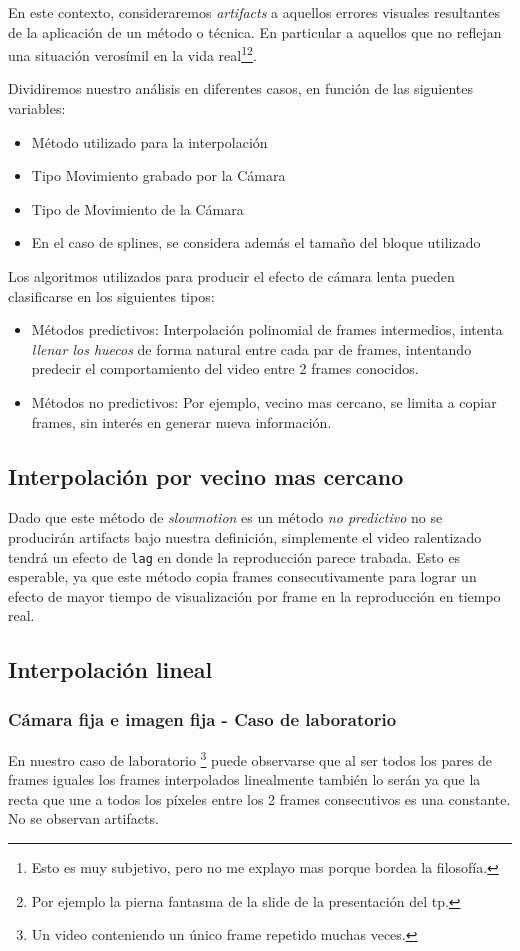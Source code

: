 En este contexto, consideraremos \emph{artifacts} a aquellos errores visuales resultantes de la aplicaci\'on de un m\'etodo o t\'ecnica. En particular a aquellos que no reflejan una situación verosímil en la vida real\footnote{Esto es muy subjetivo, pero no me explayo mas porque bordea la filosofía.}\footnote{Por ejemplo la pierna fantasma de la slide de la presentación del tp.}.

Dividiremos nuestro análisis en diferentes casos, en función de las siguientes variables:
\begin{itemize}
	\item Método utilizado para la interpolación
	\item Tipo Movimiento grabado por la Cámara
	\item Tipo de Movimiento de la Cámara
	\item En el caso de splines, se considera además el tamaño del bloque utilizado
\end{itemize}

Los algoritmos utilizados para producir el efecto de cámara lenta pueden clasificarse en los siguientes tipos:
\begin{itemize}
	\item Métodos predictivos: Interpolación polinomial de frames intermedios, intenta \emph{llenar los huecos} de forma natural entre cada par de frames, intentando predecir el comportamiento del video entre 2 frames conocidos.
	\item Métodos no predictivos: Por ejemplo, vecino mas cercano, se limita a copiar frames, sin interés en generar nueva información.
\end{itemize}

\subsection{Interpolación por vecino mas cercano}
Dado que este método de \emph{slowmotion} es un método \emph{no predictivo} no se producirán artifacts bajo nuestra definición, simplemente el video ralentizado tendrá un efecto de \texttt{lag} en donde la reproducción parece trabada. Esto es esperable, ya que este método copia frames consecutivamente para lograr un efecto de mayor tiempo de visualización por frame en la reproducción en tiempo real. 

\subsection{Interpolación lineal}
\subsubsection{Cámara fija e imagen fija - Caso de laboratorio}
En nuestro caso de laboratorio \footnote{Un video conteniendo un único frame repetido muchas veces.} puede observarse que al ser todos los pares de frames iguales los frames interpolados linealmente también lo serán ya que la recta que une a todos los píxeles entre los 2 frames consecutivos es una constante. No se observan artifacts.

